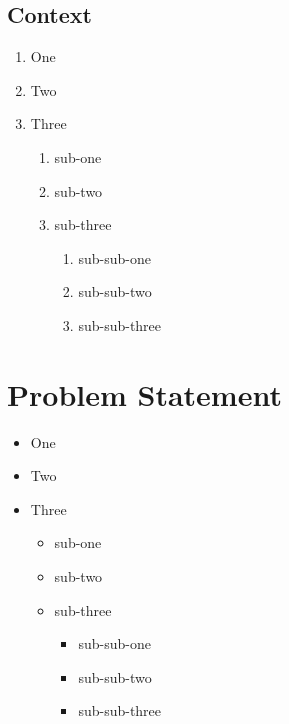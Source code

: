 \documentclass[12pt]{report} %
\begin{document}
\subsection{Context}
    \begin{enumerate}
    \item{One}
    \item{Two}
    \item{Three}
        \begin{enumerate}
            \item{sub-one}
            \item{sub-two}
            \item{sub-three}
                \begin{enumerate}
                    \item{sub-sub-one}
                    \item{sub-sub-two}
                    \item{sub-sub-three}
                \end{enumerate}
        \end{enumerate}
    \end{enumerate}
    \section{Problem Statement}

    \begin{itemize}
    \item{One}
    \item{Two}
    \item{Three}
        \begin{itemize}
            \item{sub-one}
            \item{sub-two}
            \item{sub-three}
                \begin{itemize}
                    \item{sub-sub-one}
                    \item{sub-sub-two}
                    \item{sub-sub-three}
                \end{itemize}
        \end{itemize}
    \end{itemize}
\end{document}
